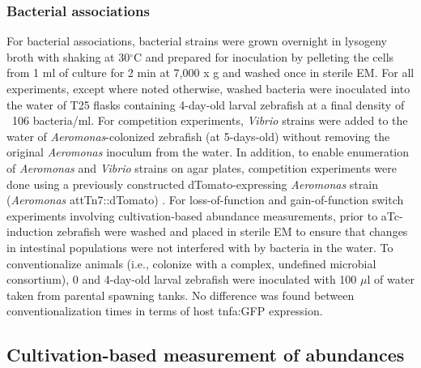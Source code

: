 \subsubsection{Bacterial associations} 
For bacterial associations, bacterial strains were grown overnight in lysogeny broth with shaking at 30$^\circ$C and prepared for inoculation by pelleting the cells from 1 ml of culture for 2 min at 7,000 x g and washed once in sterile EM. For all experiments, except where noted otherwise, washed bacteria were inoculated into the water of T25 flasks containing 4-day-old larval zebrafish at a final density of ~106 bacteria/ml. For competition experiments, \textit{Vibrio} strains were added to the water of \textit{Aeromonas}-colonized zebrafish (at 5-days-old) without removing the original \textit{Aeromonas} inoculum from the water. In addition, to enable enumeration of \textit{Aeromonas} and \textit{Vibrio} strains on agar plates, competition experiments were done using a previously constructed dTomato-expressing \textit{Aeromonas} strain (\textit{Aeromonas} attTn7::dTomato) \cite{wiles_modernized_2018}. For loss-of-function and gain-of-function switch experiments involving cultivation-based abundance measurements, prior to aTc-induction zebrafish were washed and placed in sterile EM to ensure that changes in intestinal populations were not interfered with by bacteria in the water. To conventionalize animals (i.e., colonize with a complex, undefined microbial consortium), 0 and 4-day-old larval zebrafish were inoculated with 100 $\mu$l of water taken from parental spawning tanks. No difference was found between conventionalization times in terms of host tnfa:GFP expression. 

\subsection{Cultivation-based measurement of abundances}

